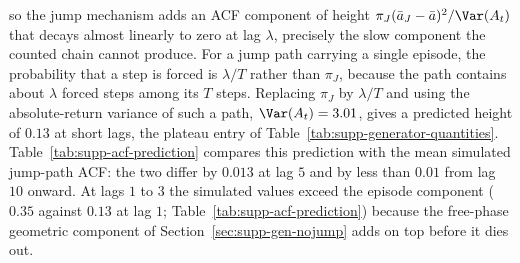 so the jump mechanism adds an ACF component of height $\pi_J (\bar a_J
- \bar a)^2 / \Var(A_t)$ that decays almost linearly to zero at lag
$\lambda$, precisely the slow component the counted chain cannot
produce. For a jump path carrying a single episode, the probability
that a step is forced is $\lambda / T$ rather than $\pi_J$, because
the path contains about $\lambda$ forced steps among its $T$ steps.
Replacing $\pi_J$ by $\lambda / T$ and using the absolute-return
variance of such a path, $\Var(A_t) = 3.01$, gives a predicted height
of $0.13$ at short lags, the plateau entry of
Table~\ref{tab:supp-generator-quantities}.
Table~\ref{tab:supp-acf-prediction} compares
this prediction with the mean simulated jump-path ACF: the two differ
by $0.013$ at lag $5$ and by less than $0.01$ from lag $10$ onward. At lags $1$ to $3$ the
simulated values exceed the episode component ($0.35$ against $0.13$
at lag $1$; Table~\ref{tab:supp-acf-prediction}) because the free-phase geometric component of
Section~\ref{sec:supp-gen-nojump} adds on top before it dies out.

\begin{table}[tbp]
\centering
\caption{\textbf{Episode-overlap prediction of the jump-path
    absolute-return autocorrelation function (ACF) against
    simulation.} The prediction evaluates
    Eq.~\eqref{eq:supp-acf-wj} at the fitted SPY values with the
    single-episode forced fraction $\lambda/T$ in place of $\pi_J$
    and the same-episode probability $h(\tau)$ of
    Eq.~\eqref{eq:supp-h}. The simulated column is the mean ACF of
    $|G_t|$ over the $99$ jump-active paths among $400$ simulated
    in-sample-length paths. The free-phase component of
    Eq.~\eqref{eq:supp-acf-nj} is excluded from the prediction; it
    has decayed below $0.01$ from lag $5$ onward.}
\label{tab:supp-acf-prediction}
\small

\end{table}

